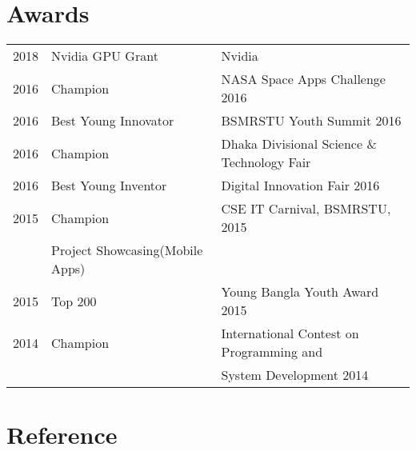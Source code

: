 \documentclass[]{deedy-resume-openfont}
\begin{document}
\begin{minipage}[t]{0.66\textwidth}




\section{Awards} 
\begin{tabular}{rll}
	2018 & Nvidia GPU Grant & Nvidia \\

2016     & Champion & NASA Space Apps Challenge 2016 \\
 2016     & Best Young Innovator & BSMRSTU Youth Summit 2016 \\
 2016     & Champion & Dhaka Divisional Science \& Technology Fair\\
 2016	     & Best Young Inventor  & Digital Innovation Fair 2016\\
 2015	     & Champion  & CSE IT Carnival, BSMRSTU, 2015\\
 & Project Showcasing(Mobile Apps) & \\
 2015	     & Top 200  & Young Bangla Youth Award 2015\\
 2014	     & Champion  & International Contest on Programming and\\
 & & System Development 2014\\

\end{tabular}
\sectionsep





\section{Reference} 




\end{minipage}
\end{document}
